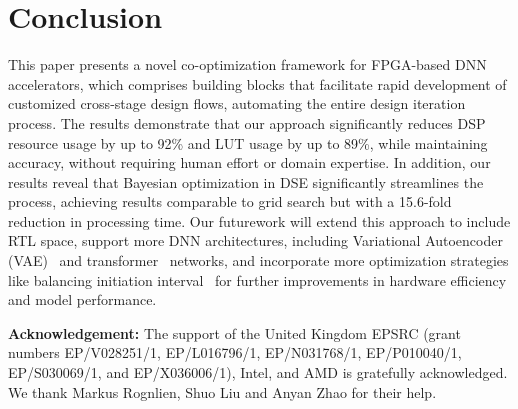 \section{Conclusion}
\label{sec:conclusion}

This paper presents a novel co-optimization framework for FPGA-based DNN accelerators, which comprises building blocks that facilitate rapid development of customized cross-stage design flows, automating the entire design iteration process. The results demonstrate that our approach significantly reduces DSP resource usage by up to 92\% and LUT usage by up to 89\%, while maintaining accuracy, without requiring human effort or domain expertise. In addition, our results reveal that Bayesian optimization in DSE significantly streamlines the process, achieving results comparable to grid search but with a 15.6-fold reduction in processing time. Our futurework will extend this approach to include RTL space, support more DNN architectures, including Variational Autoencoder (VAE)~\cite{que2024low} and transformer~\cite{wojcicki2022accelerating} networks, and incorporate more optimization strategies like balancing initiation interval~\cite{que2021accelerating, rognlien2022hardware} for further improvements in hardware efficiency and model performance.



\vspace{0.2cm}
\noindent \textbf{Acknowledgement:} The support of the United Kingdom EPSRC (grant numbers EP/V028251/1, EP/L016796/1, EP/N031768/1, EP/P010040/1, EP/S030069/1, and EP/X036006/1), Intel, and AMD is gratefully acknowledged. We thank Markus Rognlien, Shuo Liu and Anyan Zhao for their help. 